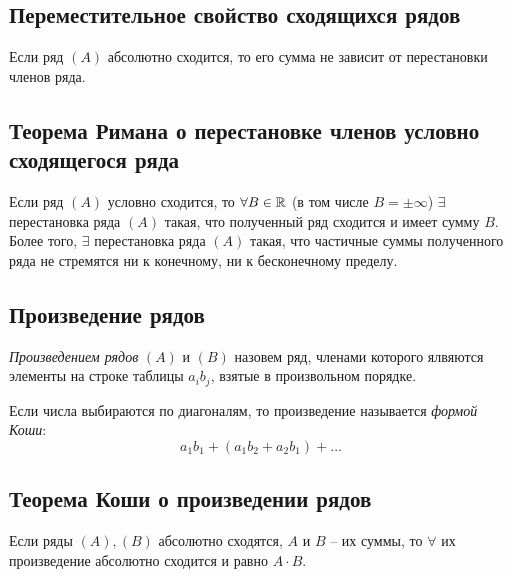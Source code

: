 \subsection{Переместительное свойство сходящихся рядов}

\begin{theorem}
    Если ряд $(A)$ абсолютно сходится, то его сумма не зависит от перестановки членов ряда.
\end{theorem}

\subsection{Теорема Римана о перестановке членов условно сходящегося ряда}

\begin{theorem}
    Если ряд $(A)$ условно сходится, то $\forall B \in \mathbb{R}$ (в том числе $B = \pm\infty$) $\exists$ перестановка ряда $(A)$ такая, что полученный ряд сходится и имеет сумму $B$. Более того, $\exists$ перестановка ряда $(A)$ такая, что частичные суммы полученного ряда не стремятся ни к конечному, ни к бесконечному пределу.
\end{theorem}

\subsection{Произведение рядов}

\begin{definition}
    \emph{Произведением рядов} $(A)$ и $(B)$ назовем ряд, членами которого ялвяются элементы на строке таблицы $a_ib_j$, взятые в произвольном порядке.

    Если числа выбираются по диагоналям, то произведение называется \emph{формой Коши}:
    \[
        a_1 b_1 + (a_1 b_2 + a_2 b_1) + \ldots
    \]
\end{definition}

\subsection{Теорема Коши о произведении рядов}

\begin{theorem}
    Если ряды $ (A),(B) $ абсолютно сходятся, $A$ и $B$ -- их суммы, то $\forall$ их произведение абсолютно сходится и равно $A \cdot B$.
\end{theorem}

